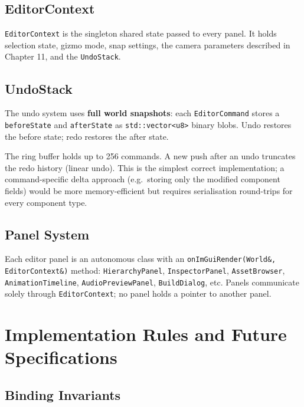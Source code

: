 \documentclass[12pt, a4paper]{report}
\theoremstyle{definition}
\theoremstyle{remark}
\begin{document}
\section{EditorContext}

\texttt{EditorContext} is the singleton shared state passed to every
panel. It holds selection state, gizmo mode, snap settings, the camera
parameters described in Chapter 11, and the \texttt{UndoStack}.

\section{UndoStack}

The undo system uses \textbf{full world snapshots}: each
\texttt{EditorCommand} stores a \texttt{beforeState} and \texttt{afterState}
as \texttt{std::vector<u8>} binary blobs. Undo restores the before state;
redo restores the after state.

The ring buffer holds up to 256 commands. A new push after an undo
truncates the redo history (linear undo). This is the simplest correct
implementation; a command-specific delta approach (e.g.\ storing only
the modified component fields) would be more memory-efficient but
requires serialisation round-trips for every component type.

\section{Panel System}

Each editor panel is an autonomous class with an \texttt{onImGuiRender(World\&, EditorContext\&)} method:
\texttt{HierarchyPanel}, \texttt{InspectorPanel}, \texttt{AssetBrowser},
\texttt{AnimationTimeline}, \texttt{AudioPreviewPanel}, \texttt{BuildDialog}, etc.
Panels communicate solely through \texttt{EditorContext}; no panel holds
a pointer to another panel.

\chapter{Implementation Rules and Future Specifications}

\section{Binding Invariants}
\end{document}
